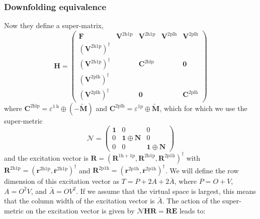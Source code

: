 \subsubsection{Downfolding equivalence}
Now they define a super-matrix,
\begin{equation}
\bm{H} =
\begin{pmatrix}
\bm{F} & \bm{V}^{2\mathrm{h1p}} & \bm{V}^{2\mathrm{h1p}} & \bm{V}^{2\mathrm{plh}} & \bm{V}^{2\mathrm{plh}} \\
\left(\bm{V}^{2\mathrm{h1p}}\right)^{\dagger} &  &  & & \\
\left(\bm{V}^{2\mathrm{h1p}}\right)^{\dagger} &  & \bm{C}^{2\mathrm{hlp}} & & \bm{0} \\
\left(\bm{V}^{2\mathrm{plh}}\right)^{\dagger} & & & & \\
\left(\bm{V}^{2\mathrm{plh}}\right)^{\dagger} &  & \bm{0} & & \bm{C}^{2\mathrm{plh}}
\end{pmatrix}
\end{equation}
where $\mathbf{C}^{2 \mathrm{hlp}}=\varepsilon^{1 \mathrm{~h}} \oplus(-\tilde{\mathbf{M}})$ and $\mathbf{C}^{2 \mathrm{plh}}=\varepsilon^{1 \mathrm{p}} \oplus \tilde{\mathbf{M}}$, which for which we use the super-metric
$$
\bm{\mathcal{N}}=\left(\begin{array}{ccc}
\bm{1} & 0 & 0 \\
0 & \bm{1} \oplus \bm{N} & 0 \\
0 & 0 & \bm{1} \oplus \bm{N}
\end{array}\right)
$$
and the excitation vector is $\bm{R} = (\bm{R}^{1\mathrm{h}+1\mathrm{p}}, \bm{R}^{2\mathrm{h}1\mathrm{p}}, \bm{R}^{2\mathrm{p}1\mathrm{h}})^\dag$ with $\bm{R}^{2\mathrm{h}1\mathrm{p}}=(\bm{r}^{2\mathrm{h}1\mathrm{p}}, \bm{\bar{r}}^{2\mathrm{h}1\mathrm{p}})^\dag$ and $\bm{R}^{2\mathrm{p}1\mathrm{h}}=(\bm{r}^{2\mathrm{p}1\mathrm{h}}, \bm{\bar{r}}^{2\mathrm{p}1\mathrm{h}})^\dag$. We will define the row dimension of this excitation vector as $T=P+2A+2\bar{A}$, where $P=O+V$, $A=O^2V$, and $\bar{A}=OV^2$. If we assume that the virtual space is largest, this means that the column width of the excitation vector is $\bar{A}$. The action of the super-metric on the excitation vector is given by
$\bm{\mathcal{N}} \bm{H} \bm{R} = \bm{R} \bm{E}$ leads to:
